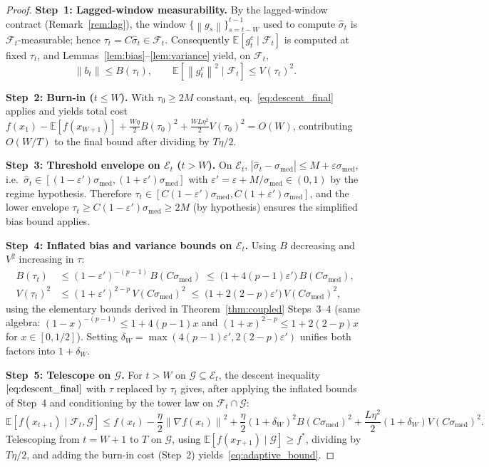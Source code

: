 \documentclass[11pt]{article}
\theoremstyle{definition}
\newcommand{\E}{\mathbb{E}}
\newcommand{\norm}[1]{\left\| #1 \right\|}
\newcommand{\abs}[1]{\left| #1 \right|}
\newcommand{\shat}{\hat{\sigma}}
\newcommand{\Filt}{\mathcal{F}}
\begin{document}
\begin{proof}
\textbf{Step~1: Lagged-window measurability.}
By the lagged-window contract (Remark~\ref{rem:lag}), the window
$\{\norm{g_s}\}_{s = t-W}^{t-1}$ used to compute $\shat_t$ is
$\Filt_t$-measurable; hence $\tau_t = C\shat_t \in \Filt_t$. Consequently
$\E[g_t^c \mid \Filt_t]$ is computed at fixed $\tau_t$, and
Lemmas~\ref{lem:bias}--\ref{lem:variance} yield, on $\Filt_t$,
\[
  \norm{b_t} \leq B(\tau_t),
  \qquad
  \E[\norm{g_t^c}^2 \mid \Filt_t] \leq V(\tau_t)^2.
\]

\textbf{Step~2: Burn-in ($t \leq W$).}
With $\tau_0 \geq 2M$ constant, eq.~\eqref{eq:descent_final} applies and
yields total cost $f(x_1) - \E[f(x_{W+1})] + \frac{W\eta}{2}B(\tau_0)^2
+ \frac{WL\eta^2}{2}V(\tau_0)^2 = O(W)$, contributing $O(W/T)$ to the
final bound after dividing by $T\eta/2$.

\textbf{Step~3: Threshold envelope on $\mathcal E_t$ ($t > W$).}
On $\mathcal E_t$, $\abs{\shat_t - \sigma_{\mathrm{med}}} \leq M + \varepsilon\sigma_{\mathrm{med}}$,
i.e.\ $\shat_t \in [(1-\varepsilon')\sigma_{\mathrm{med}}, (1+\varepsilon')\sigma_{\mathrm{med}}]$
with $\varepsilon' = \varepsilon + M/\sigma_{\mathrm{med}} \in (0,1)$ by the
regime hypothesis. Therefore
$\tau_t \in [C(1-\varepsilon')\sigma_{\mathrm{med}}, C(1+\varepsilon')\sigma_{\mathrm{med}}]$,
and the lower envelope $\tau_t \geq C(1-\varepsilon')\sigma_{\mathrm{med}} \geq 2M$
\textup{(}by hypothesis\textup{)} ensures the simplified bias bound applies.

\textbf{Step~4: Inflated bias and variance bounds on $\mathcal E_t$.}
Using $B$ decreasing and $V^2$ increasing in $\tau$:
\begin{align*}
  B(\tau_t) &\leq (1-\varepsilon')^{-(p-1)}\,B(C\sigma_{\mathrm{med}})
    \;\leq\; \bigl(1 + 4(p-1)\varepsilon'\bigr)\,B(C\sigma_{\mathrm{med}}), \\
  V(\tau_t)^2 &\leq (1+\varepsilon')^{2-p}\,V(C\sigma_{\mathrm{med}})^2
    \;\leq\; \bigl(1 + 2(2-p)\varepsilon'\bigr)\,V(C\sigma_{\mathrm{med}})^2,
\end{align*}
using the elementary bounds derived in Theorem~\ref{thm:coupled} Steps~3--4
\textup{(}same algebra: $(1-x)^{-(p-1)} \leq 1+4(p-1)x$ and $(1+x)^{2-p}\leq 1+2(2-p)x$
for $x \in [0,1/2]$\textup{)}. Setting
$\delta_W = \max(4(p-1)\varepsilon', 2(2-p)\varepsilon')$ unifies both
factors into $1 + \delta_W$.

\textbf{Step~5: Telescope on $\mathcal G$.}
For $t > W$ on $\mathcal G \subseteq \mathcal E_t$, the descent inequality
$\eqref{eq:descent_final}$ with $\tau$ replaced by $\tau_t$ gives, after
applying the inflated bounds of Step~4 and conditioning by the tower law on
$\Filt_t \cap \mathcal G$:
\[
  \E\!\left[f(x_{t+1}) \mid \Filt_t, \mathcal G\right]
  \leq f(x_t) - \frac{\eta}{2}\norm{\nabla f(x_t)}^2
    + \frac{\eta}{2}(1+\delta_W)^2 B(C\sigma_{\mathrm{med}})^2
    + \frac{L\eta^2}{2}(1+\delta_W) V(C\sigma_{\mathrm{med}})^2.
\]
Telescoping from $t = W+1$ to $T$ on $\mathcal G$, using
$\E[f(x_{T+1})\mid\mathcal G] \geq f^*$, dividing by $T\eta/2$, and adding the
burn-in cost (Step~2) yields~\eqref{eq:adaptive_bound}.


\end{proof}
\end{document}
